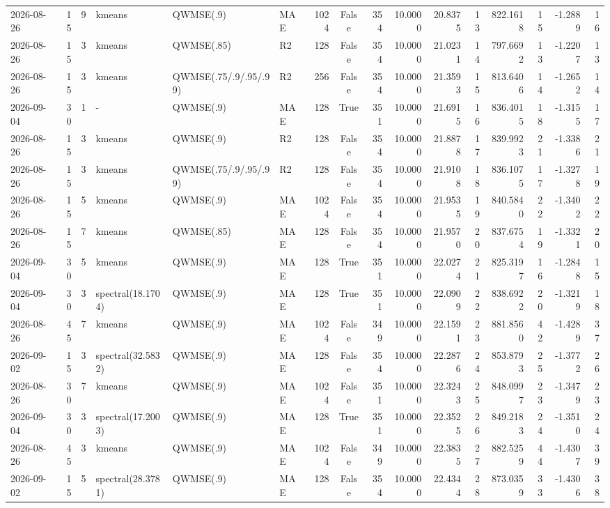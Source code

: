 \documentclass[10pt]{article}
\begin{document}
\begin{landscape}
\begin{longtable}{@{}lrrlllrcrrrrrrrr@{}}
2026-08-26 & 15 & 9 & kmeans & QWMSE(.9) & MAE & 1024 & False & 354 & 10.0000 & 20.8375 & 13 & 822.1618 & 15 & -1.2889 & 16 \\
2026-08-26 & 15 & 3 & kmeans & QWMSE(.85) & R2 & 128 & False & 354 & 10.0000 & 21.0231 & 14 & 797.6692 & 13 & -1.2207 & 13 \\
2026-08-26 & 15 & 3 & kmeans & QWMSE(.75/.9/.95/.99) & R2 & 256 & False & 354 & 10.0000 & 21.3593 & 15 & 813.6406 & 14 & -1.2652 & 14 \\
2026-09-04 & 30 & 1 & - & QWMSE(.9) & MAE & 128 & True & 351 & 10.0000 & 21.6915 & 16 & 836.4015 & 18 & -1.3155 & 17 \\
2026-08-26 & 15 & 3 & kmeans & QWMSE(.9) & R2 & 128 & False & 354 & 10.0000 & 21.8878 & 17 & 839.9923 & 21 & -1.3386 & 21 \\
2026-08-26 & 15 & 3 & kmeans & QWMSE(.75/.9/.95/.99) & R2 & 128 & False & 354 & 10.0000 & 21.9108 & 18 & 836.1075 & 17 & -1.3278 & 19 \\
2026-08-26 & 15 & 5 & kmeans & QWMSE(.9) & MAE & 1024 & False & 354 & 10.0000 & 21.9535 & 19 & 840.5840 & 22 & -1.3402 & 22 \\
2026-08-26 & 15 & 7 & kmeans & QWMSE(.85) & MAE & 128 & False & 354 & 10.0000 & 21.9570 & 20 & 837.6754 & 19 & -1.3321 & 20 \\
2026-09-04 & 30 & 5 & kmeans & QWMSE(.9) & MAE & 128 & True & 351 & 10.0000 & 22.0274 & 21 & 825.3197 & 16 & -1.2848 & 15 \\
2026-09-04 & 30 & 3 & spectral(18.1704) & QWMSE(.9) & MAE & 128 & True & 351 & 10.0000 & 22.0909 & 22 & 838.6922 & 20 & -1.3219 & 18 \\
2026-08-26 & 45 & 7 & kmeans & QWMSE(.9) & MAE & 1024 & False & 349 & 10.0000 & 22.1591 & 23 & 881.8560 & 42 & -1.4289 & 37 \\
2026-09-02 & 15 & 3 & spectral(32.5832) & QWMSE(.9) & MAE & 128 & False & 354 & 10.0000 & 22.2876 & 24 & 853.8793 & 25 & -1.3772 & 26 \\
2026-08-26 & 30 & 7 & kmeans & QWMSE(.9) & MAE & 1024 & False & 351 & 10.0000 & 22.3243 & 25 & 848.0997 & 23 & -1.3479 & 23 \\
2026-09-04 & 30 & 3 & spectral(17.2003) & QWMSE(.9) & MAE & 128 & True & 351 & 10.0000 & 22.3525 & 26 & 849.2183 & 24 & -1.3510 & 24 \\
2026-08-26 & 45 & 3 & kmeans & QWMSE(.9) & MAE & 1024 & False & 349 & 10.0000 & 22.3835 & 27 & 882.5259 & 44 & -1.4307 & 39 \\
2026-09-02 & 15 & 5 & spectral(28.3781) & QWMSE(.9) & MAE & 128 & False & 354 & 10.0000 & 22.4344 & 28 & 873.0359 & 33 & -1.4306 & 38 \\

\end{longtable}
\end{landscape}
\end{document}
